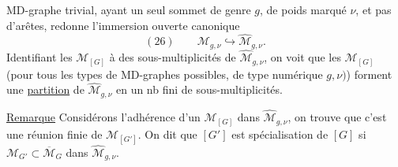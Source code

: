 MD-graphe trivial, ayant un seul sommet de genre $g$, de poids marqué $\nu$, et pas d'arêtes, redonne l'immersion ouverte canonique
\[
(26)\qquad\mathcal M_{g,\nu}\hookrightarrow\widehat{\mathcal M}_{g,\nu}.
\]
Identifiant les $\mathcal M_{[G]}$ à des sous-multiplicités de $\widehat{\mathcal M}_{g,\nu}$, on voit que les $\mathcal M_{[G]}$ (pour tous les types de MD-graphes possibles, de type numérique $g,\nu)$) forment une \uline{partition} de $\widehat{\mathcal M}_{g,\nu}$ en un nb fini de sous-multiplicités.

\uline{Remarque} Considérons l'adhérence d'un $\mathcal M_{[G]}$ dans $\widehat{\mathcal M}_{g,\nu}$, on trouve que c'est une réunion finie de $\mathcal M_{[G']}$. On dit que $[G']$ est spécialisation de $[G]$ si $\mathcal M_{G'}\subset\overline{\mathcal M}_G$ dans $\widehat{\mathcal M}_{g,\nu}$.
